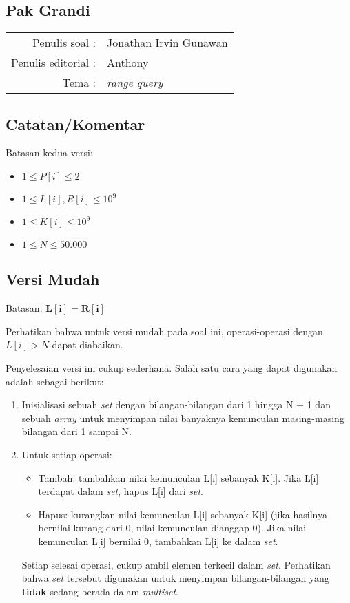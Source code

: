 \documentclass[../main_editorial.tex]{subfiles} %
\newcommand{\problemName}{Pak Grandi}
\newcommand{\problemWriter}{Jonathan Irvin Gunawan}
\newcommand{\problemEditorialWriter}{Anthony}
\newcommand{\problemTags}{\textit{range query}}
\begin{document}
\begin{center}
    \section*{\problemName}
    \addcontentsline{toc}{section}{\problemName} %
    
    \begin{tabular}{rl}
    Penulis soal : & \problemWriter \\
    Penulis editorial : & \problemEditorialWriter \\
    Tema : & \problemTags
    \end{tabular}
\end{center}

\subsection*{Catatan/Komentar}

Batasan kedua versi:
\begin{itemize}
	\item $1 \le P[i] \le 2$
	\item $1 \le L[i], R[i] \le 10^9$
	\item $1 \le K[i] \le 10^9$
	\item $1 \le N \le 50.000$
\end{itemize}

\subsection*{Versi Mudah}
Batasan: $\mathbf{L[i]=R[i]}$

Perhatikan bahwa untuk versi mudah pada soal ini, operasi-operasi dengan $L[i] > N$ dapat diabaikan.

Penyelesaian versi ini cukup sederhana. Salah satu cara yang dapat digunakan adalah sebagai berikut:

\begin{enumerate}
	\item Inisialisasi sebuah \textit{set} dengan bilangan-bilangan dari 1 hingga N + 1 dan sebuah \textit{array} untuk menyimpan nilai banyaknya kemunculan masing-masing bilangan dari 1 sampai N.
	\item Untuk setiap operasi:
		\begin{itemize}
			\item Tambah: tambahkan nilai kemunculan L[i] sebanyak K[i]. Jika L[i] terdapat dalam \textit{set}, hapus L[i] dari \textit{set}.
			\item Hapus: kurangkan nilai kemunculan L[i] sebanyak K[i] (jika hasilnya bernilai kurang dari 0, nilai kemunculan dianggap 0). Jika nilai kemunculan L[i] bernilai 0, tambahkan L[i] ke dalam \textit{set}.
		\end{itemize}
		Setiap selesai operasi, cukup ambil elemen terkecil dalam \textit{set}. Perhatikan bahwa \textit{set} tersebut digunakan untuk menyimpan bilangan-bilangan yang \textbf{tidak} sedang berada dalam \textit{multiset}.
\end{enumerate}
\end{document}
